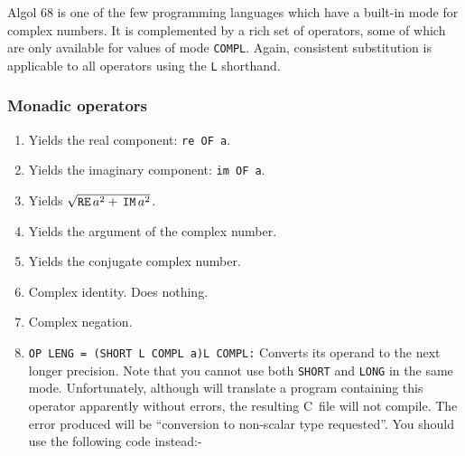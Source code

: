 Algol 68 is one of the few programming languages which have a
built-in mode for complex numbers. It is complemented by a rich set
of operators, some of which are only available for values of mode
\verb|COMPL|. Again, consistent substitution is applicable to all
operators using the \verb|L| shorthand.

\subsubsection*{Monadic operators}
\begin{enumerate}
\item {}\newline
Yields the real component: \verb|re OF a|.
\item {} \newline
Yields the imaginary component: \verb|im OF a|.
\item {} \newline
Yields $\sqrt{\mbox{\texttt{RE}}\,a^2+\,\mbox{\texttt{IM}}\,a^2}$.
\item {} \newline
Yields the argument of the complex number.
\item {} \newline
Yields the conjugate complex number.
\item {} \newline
Complex identity. Does nothing.
\item {} \newline
Complex negation.
\item {} \newline
\verb|OP LENG = (SHORT L COMPL a)L COMPL:| \newline
Converts its operand to the next longer precision. Note that you
cannot use both \verb|SHORT| and \verb|LONG| in the same mode.
Unfortunately, although  will
translate a program containing this operator apparently without
errors, the resulting C~file will not compile. The error produced
will be ``conversion to non-scalar type requested''. You should use
the following code instead:-

\end{enumerate}

